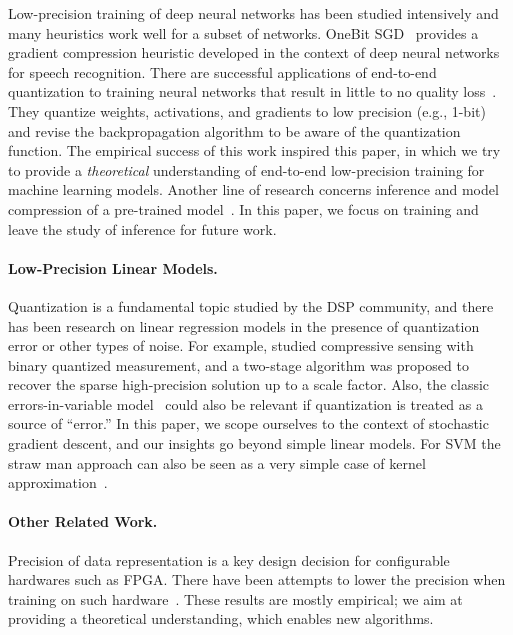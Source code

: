 \documentclass{article}
\begin{document}
Low-precision training of deep neural networks has been studied
intensively and many heuristics work well for a subset of networks.
OneBit SGD~\cite{Frank:2014:Interspeech} provides
a gradient compression heuristic developed in the context of deep 
neural networks for speech recognition. There are successful 
applications of end-to-end quantization to training neural networks that 
result in little to no quality loss~\cite{hubara2016quantized,
rastegari2016xnor,zhou2016dorefa,miyashita2016convolutional,li2016ternary,gupta2015deep}. They quantize weights, activations, and gradients 
to low precision (e.g., 1-bit) and revise the backpropagation 
algorithm to be aware of the quantization function.
The empirical success of this work inspired this paper, in which we try
to provide a {\em theoretical} understanding of end-to-end low-precision
training for machine learning models.
Another line of research concerns inference and model
compression of a pre-trained model~\cite{vanhoucke2011improving,gong2014compressing,Han:2016:ICLR,lin2016fixed,kim2016bitwise,kim2015compression,wu2016quantized}.
In this paper, we focus on training and leave the study of
inference for future work.

\paragraph{Low-Precision Linear Models.}

Quantization is a fundamental topic studied by the
DSP community, and there has been research on
linear regression models in the presence of quantization
error or other types of noise. For example,
\citet{Gopi:2013:ICML} studied compressive sensing
with binary quantized measurement, and a two-stage algorithm was proposed to recover the sparse high-precision solution up to a scale factor.
Also, the
classic errors-in-variable model~\cite{Hall:2008:Book}
could also be relevant if quantization is treated 
as a source of ``error.'' In this paper, we scope
ourselves to the context of stochastic gradient descent, 
and our insights go beyond simple linear models.
For SVM the straw man approach 
can also be seen as a very simple case of kernel 
approximation~\cite{Cortes:2010:AISTATS}.

\paragraph{Other Related Work.} Precision of data
representation is a key design decision
for configurable hardwares such as FPGA. There have been attempts to
lower the precision when training on such hardware~\cite{Kim:2011:ICASSP}. 
These results are mostly empirical; we
aim at providing a theoretical understanding, which 
enables new algorithms.
\end{document}
